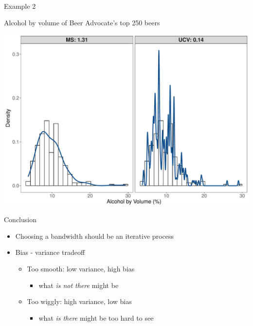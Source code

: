 \documentclass[ignorenonframetext,]{beamer}
\providecommand{\tightlist}{%
\setlength{\itemsep}{0pt}\setlength{\parskip}{0pt}}
\begin{document}
\begin{frame}{Example 2}

Alcohol by volume of Beer Advocate's top 250 beers

\includegraphics{ProjectPresentation_files/figure-beamer/unnamed-chunk-4-1.pdf}

\end{frame}

\begin{frame}{Conclusion}

\begin{itemize}
\tightlist
\item
  Choosing a bandwidth should be an iterative process
\item
  Bias - variance tradeoff

  \begin{itemize}
  \tightlist
  \item
    Too smooth: low variance, high bias

    \begin{itemize}
    \tightlist
    \item
      what \emph{is not there} might be
    \end{itemize}
  \item
    Too wiggly: high variance, low bias

    \begin{itemize}
    \tightlist
    \item
      what \emph{is there} might be too hard to see
    \end{itemize}
  \end{itemize}
\end{itemize}

\end{frame}
\end{document}
